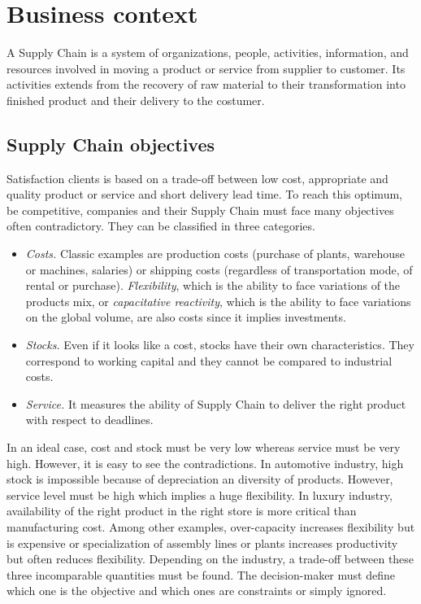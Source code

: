 \chapter{Business context}
\label{chap:business-context}


A Supply Chain is a system of organizations, people, activities, information, and resources involved in moving a product or service from supplier to customer.
Its activities extends from the recovery of raw material to their transformation into finished product and their delivery to the costumer.


\section{Supply Chain objectives}


Satisfaction clients is based on a trade-off between low cost, appropriate and quality product or service and short delivery lead time.
To reach this optimum, \ie be competitive, companies and their Supply Chain must face many objectives often contradictory.
They can be classified in three categories.
\begin{itemize}
  \item \emph{Costs.} Classic examples are production costs (purchase of plants, warehouse or machines, salaries) or shipping costs (regardless of transportation mode, of rental or purchase).
  \emph{Flexibility}, which is the ability to face variations of the products mix, or \emph{capacitative reactivity}, which is the ability to face variations on the global volume, are also costs since it implies investments.

  \item \emph{Stocks.} Even if it looks like a cost, stocks have their own characteristics.
  They correspond to working capital and they cannot be compared to industrial costs.

  \item \emph{Service.} It measures the ability of Supply Chain to deliver the right product with respect to deadlines.
\end{itemize}
In an ideal case, cost and stock must be very low whereas service must be very high.
However, it is easy to see the contradictions.
In automotive industry, high stock is impossible because of depreciation an diversity of products.
However, service level must be high which implies a huge flexibility.
In luxury industry, availability of the right product in the right store is more critical than manufacturing cost.
Among other examples, over-capacity increases flexibility but is expensive or specialization of assembly lines or plants increases productivity but often reduces flexibility.
Depending on the industry, a trade-off between these three incomparable quantities must be found.
The decision-maker must define which one is the objective and which ones are constraints or simply ignored.



